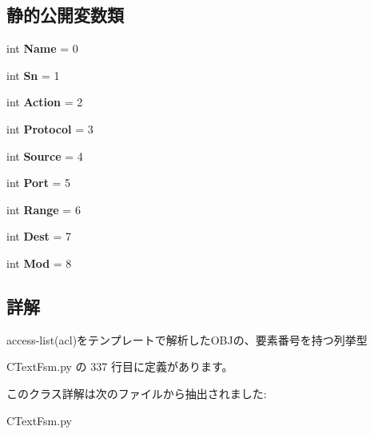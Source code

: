 \subsection*{静的公開変数類}
\begin{DoxyCompactItemize}
\item 
\mbox{\label{classCTextFsm_1_1eAcl_af278427cdabb8428f6f56bd22cd3eaf4}} 
int {\bfseries Name} = 0
\item 
\mbox{\label{classCTextFsm_1_1eAcl_ae3ba3a26b7fc2cf4bc87a96334007d67}} 
int {\bfseries Sn} = 1
\item 
\mbox{\label{classCTextFsm_1_1eAcl_aa756e7fa1fad401bd9f6b2d5fac483d5}} 
int {\bfseries Action} = 2
\item 
\mbox{\label{classCTextFsm_1_1eAcl_ad7b72e15c274a512272cb3a5d797d77d}} 
int {\bfseries Protocol} = 3
\item 
\mbox{\label{classCTextFsm_1_1eAcl_ad85ff93e7aeca787c474e349d4c5783f}} 
int {\bfseries Source} = 4
\item 
\mbox{\label{classCTextFsm_1_1eAcl_adadcea6d4de004b3c22c1d6bdb0b609b}} 
int {\bfseries Port} = 5
\item 
\mbox{\label{classCTextFsm_1_1eAcl_a6479f7a5827d69a328ce09ec19856819}} 
int {\bfseries Range} = 6
\item 
\mbox{\label{classCTextFsm_1_1eAcl_a3b0f4eba9764ceedb310c15470902d2f}} 
int {\bfseries Dest} = 7
\item 
\mbox{\label{classCTextFsm_1_1eAcl_a9bedd61b26ecbe70bed6df2821e38658}} 
int {\bfseries Mod} = 8
\end{DoxyCompactItemize}


\subsection{詳解}
\begin{DoxyVerb}access-list(acl)をテンプレートで解析したOBJの、要素番号を持つ列挙型
\end{DoxyVerb}
 

 C\+Text\+Fsm.\+py の 337 行目に定義があります。



このクラス詳解は次のファイルから抽出されました\+:\begin{DoxyCompactItemize}
\item 
C\+Text\+Fsm.\+py\end{DoxyCompactItemize}
